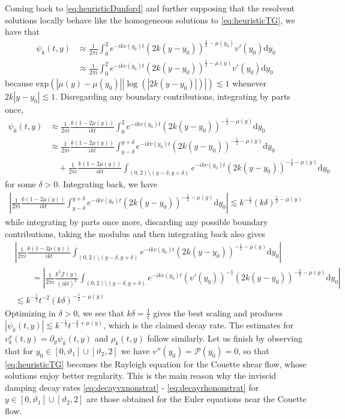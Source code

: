 \documentclass[11pt,reqno]{amsproc}
\theoremstyle{definition}
\numberwithin{equation}{section}
\newcommand{\cJ}{{\mathcal{J}}}
\renewcommand{\d}{\mathrm{d}}
\renewcommand{\P}{{\mathcal{P}}}
\begin{document}
Coming back to \eqref{eq:heuristicDunford} and further supposing that the resolvent solutions locally behave like the homogeneous solutions to \eqref{eq:heuristicTG}, we have that
\begin{align*}
\psi_k(t,y) &\approx \frac{1}{2\pi i}\int_0^2 e^{-ikv(y_0)t} (2k(y-y_0))^{\frac12-\mu(y_0)} v'(y_0) \d y_0 \\
&\approx \frac{1}{2\pi i}\int_0^2 e^{-ikv(y_0)t} (2k(y-y_0))^{\frac12-\mu(y)}v'(y_0) \d y_0
\end{align*}
because $\text{exp}\left( \left|\mu(y) - \mu(y_0) \right| \left| \log (|2k(y-y_0)|) \right| \right) \lesssim 1$ whenever $2k|y-y_0|\lesssim 1$. Disregarding any boundary contributions, integrating by parts once,
\begin{align*}
\psi_k(t,y) &\approx \frac{1}{2\pi i}\frac{k(1-2\mu(y))}{ikt}\int_0^2 e^{-ikv(y_0)t} (2k(y-y_0))^{-\frac12-\mu(y)}\d y_0 \\
&\approx \frac{1}{2\pi i}\frac{k(1-2\mu(y))}{ikt}\int_{y-\delta}^{y+\delta} e^{-ikv(y_0)t} (2k(y-y_0))^{-\frac12-\mu(y)}\d y_0 \\
&\quad + \frac{1}{2\pi i}\frac{k(1-2\mu(y))}{ikt}\int_{(0,2)\setminus (y-\delta, y+\delta)} e^{-ikv(y_0)t} (2k(y-y_0))^{-\frac12-\mu(y)}\d y_0
\end{align*}
for some $\delta>0$. Integrating back, we have
\begin{align*}
\left| \frac{1}{2\pi i}\frac{k(1-2\mu(y))}{ikt}\int_{y-\delta}^{y+\delta} e^{-ikv(y_0)t} (2k(y-y_0))^{-\frac12-\mu(y)}\d y_0 \right| \lesssim k^{-\frac12}(k\delta)^{\frac12-\mu(y)}
\end{align*}
while integrating by parts once more, discarding any possible boundary contributions, taking the modulus and then integrating back also gives
\begin{align*}
&\left| \frac{1}{2\pi i}\frac{k(1-2\mu(y))}{ikt}\int_{(0,2)\setminus (y-\delta, y+\delta)} e^{-ikv(y_0)t} (2k(y-y_0))^{-\frac12-\mu(y)}\d y_0 \right| \\
&\qquad = \left| \frac{1}{2\pi i}\frac{k^2\cJ(y)}{(ikt)^2}\int_{(0,2)\setminus (y-\delta, y+\delta)} e^{-ikv(y_0)t} (v'(y_0))^{-1} (2k(y-y_0))^{-\frac32-\mu(y)} \d y_0 \right|  \\
&\lesssim k^{-\frac12}t^{-2}(k\delta)^{-\frac12-\mu(y)}
\end{align*}
Optimizing in $\delta>0$, we see that $k\delta = \frac{1}{t}$ gives the best scaling and produces $|\psi_k(t,y)| \lesssim k^{-\frac12}t^{-\frac32+\mu(y)}$, which is the claimed decay rate. The estimates for $v^x_k(t,y) = \partial_y\psi_k(t,y)$ and $\rho_k(t,y)$ follow similarly. Let us finish by observing that for $y_0\in [0,\vartheta_1]\cup [\vartheta_2,2]$ we have $v''(y_0) = \P(y_0) = 0$, so that \eqref{eq:heuristicTG} becomes the Rayleigh equation for the Couette shear flow, whose solutions enjoy better regularity. This is the main reason why the inviscid damping decay rates \eqref{eq:decayvxnonstrat} - \eqref{eq:decayrhononstrat} for $y\in [0,\vartheta_1]\cup [\vartheta_2,2]$ are those obtained for the Euler equations near the Couette flow.
\end{document}
